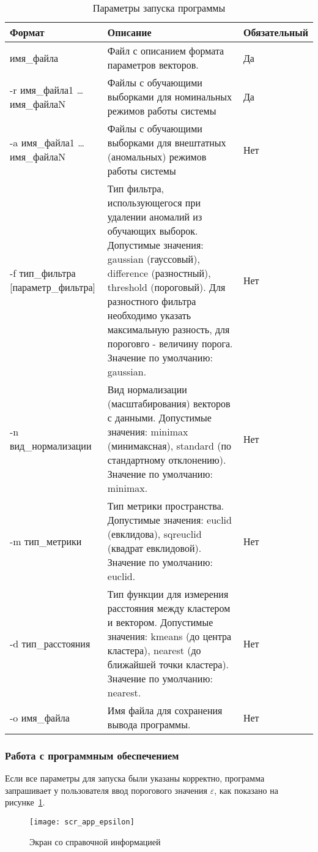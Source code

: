 \begin{table}[h]
\caption{Параметры запуска программы}
\label{tab:spec:AppOptions}

\begin{tabular}{|C{125pt}|C{255pt}|C{95pt}|}
\hline
Формат & Описание & Обязательный \\
\hline
имя\_файла & Файл с описанием формата параметров векторов. & Да \\
\hline
-r имя\_файла1 \dots имя\_файлаN & Файлы с обучающими выборками для номинальных режимов работы системы & Да \\
\hline
-a имя\_файла1 \dots имя\_файлаN & Файлы с обучающими выборками для внештатных (аномальных) режимов работы системы & Нет \\
\hline
-f тип\_фильтра [параметр\_фильтра] & Тип фильтра, использующегося при удалении аномалий из обучающих выборок. Допустимые значения: gaussian (гауссовый), difference (разностный), threshold (пороговый). Для разностного фильтра необходимо указать максимальную разность, для пороговго - величину порога. Значение по умолчанию: gaussian. & Нет \\
\hline
-n вид\_нормализации & Вид нормализации (масштабирования) векторов с данными. Допустимые значения: minimax (минимаксная), standard (по стандартному отклонению). Значение по умолчанию: minimax. & Нет \\
\hline
-m тип\_метрики & Тип метрики пространства. Допустимые значения: euclid (евклидова), sqreuclid (квадрат евклидовой). Значение по умолчанию: euclid. & Нет \\
\hline
-d тип\_расстояния & Тип функции для измерения расстояния между кластером и вектором. Допустимые значения: kmeans (до центра кластера), nearest (до ближайшей точки кластера). Значение по умолчанию: nearest. & Нет \\
\hline
-o имя\_файла & Имя файла для сохранения вывода программы. & Нет \\
\hline
\end{tabular}
\end{table}

\subsubsection{Работа с программным обеспечением}
Если все параметры для запуска были указаны корректно, программа запрашивает у пользователя ввод порогового значения $\varepsilon$, как показано на рисунке~\ref{fig:spec:scr:EnterEpsilon}.

\begin{figure}[h]
\texttt{[image: scr\_app\_epsilon]}
\caption{Экран со справочной информацией}
\label{fig:spec:scr:EnterEpsilon}
\end{figure}